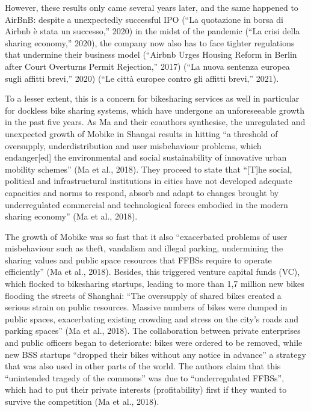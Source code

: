 \documentclass[letterpaper,10pt,english]{jupyterBook}
\begin{document}
\sphinxAtStartPar
However, these results only came several years later, and the same happened to AirBnB: despite a unexpectedly successful IPO (“La quotazione in borsa di Airbnb è stata un successo,” 2020) in the midst of the pandemic (“La crisi della sharing economy,” 2020), the company now also has to face tighter regulations that undermine their business model (“Airbnb Urges Housing Reform in Berlin after Court Overturns Permit Rejection,” 2017) (“La nuova sentenza europea sugli affitti brevi,” 2020) (“Le città europee contro gli affitti brevi,” 2021).

\sphinxAtStartPar
To a lesser extent, this is a concern for bike\sphinxhyphen{}sharing services as well \sphinxhyphen{} in particular for dockless bike sharing systems, which have undergone an unforeseeable growth in the past five years. As Ma and their coauthors synthesise, the unregulated and unexpected growth of Mobike in Shangai results in hitting “a threshold of oversupply, under\sphinxhyphen{}distribution and user misbehaviour problems, which endanger{[}ed{]} the environmental and social sustainability of innovative urban mobility schemes” (Ma et al., 2018). They proceed to state that “{[}T{]}he social, political and infrastructural institutions in cities have not developed adequate capacities and norms to respond, absorb and adapt to changes brought by under\sphinxhyphen{}regulated commercial and technological forces embodied in the modern sharing economy” (Ma et al., 2018).

\sphinxAtStartPar
The growth of Mobike was so fast that it also “exacerbated problems of user misbehaviour such as theft, vandalism and illegal parking, undermining the sharing values and public space resources that FFBSs require to operate efficiently” (Ma et al., 2018). Besides, this triggered venture capital funds (VC), which flocked to bike\sphinxhyphen{}sharing startups, leading to more than 1,7 million new bikes flooding the streets of Shanghai: “The oversupply of shared bikes created a serious strain on public resources. Massive numbers of bikes were dumped in public spaces, exacerbating existing crowding and stress on the city’s roads and parking spaces” (Ma et al., 2018). The collaboration between private enterprises and public officers began to deteriorate: bikes were ordered to be removed, while new BSS startups “dropped their bikes without any notice in advance” \sphinxhyphen{} a strategy that was also used in other parts of the world. The authors claim that this “unintended tragedy of the commons” was due to “under\sphinxhyphen{}regulated FFBSs”, which had to put their private interests (profitability) first if they wanted to survive the competition (Ma et al., 2018).
\end{document}

